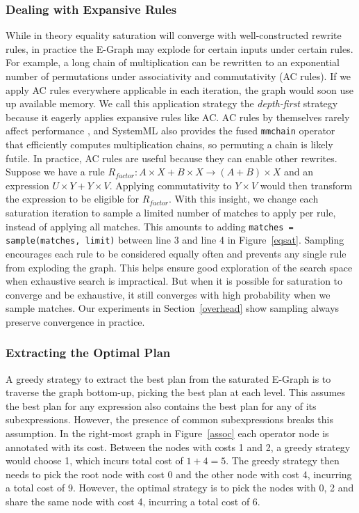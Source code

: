 \subsubsection*{Dealing with Expansive Rules}
While in theory equality saturation will converge with well-constructed rewrite
rules, in practice the E-Graph may explode for certain inputs under certain rules. For example, a long
chain of multiplication can be rewritten to an exponential number of
permutations under associativity and commutativity (AC rules). If we 
apply AC rules everywhere applicable in each iteration, the graph would soon use
up available memory. We call this application strategy the \emph{depth-first}
strategy because it eagerly applies expansive rules like AC. 
AC rules by themselves rarely affect performance , and
SystemML also provides the fused \texttt{mmchain} operator that efficiently computes
multiplication chains, so permuting a chain is likely futile. In practice, AC
rules are useful because they can enable other rewrites. Suppose we have a rule
$R_{factor}: A\times X + B\times X \rightarrow (A+B)\times X$ and an expression $U\times Y + Y\times V$.
Applying commutativity to $Y\times V$ would then transform the expression to be
eligible for $R_{factor}$. With this insight, we change each saturation
iteration to sample a limited number of matches to apply per rule, instead of
applying all matches. This amounts to adding \texttt{matches = sample(matches, limit)} between line 3 and line 4 in Figure~\ref{eqsat}. 
Sampling encourages each rule to be considered equally often
and prevents any single rule from exploding the graph. This helps ensure good
exploration of the search space when exhaustive search is impractical. 
But when it is
possible for saturation to converge and be exhaustive, it still converges with high probability
when we sample matches. Our experiments in Section~\ref{overhead} show sampling
always preserve convergence in practice.

\subsubsection*{Extracting the Optimal Plan}
\label{extraction}

A greedy strategy to extract the best plan from the saturated E-Graph is to
traverse the graph bottom-up, picking the best plan at each level. This assumes
the best plan for any expression also contains the best plan for any of its
subexpressions. However, the presence of common subexpressions breaks this
assumption. In the right-most graph in Figure~\ref{assoc} each operator 
node is annotated with its cost. 
Between the nodes with costs 1 and 2, a greedy strategy would choose 1, which
incurs total cost of $1+4=5$. The greedy strategy then needs to pick the root
node with cost 0 and the other node with cost 4, incurring a total cost of 9. 
However, the optimal strategy is to pick the nodes with 0, 2 and share the same
node with cost 4, incurring a total cost of 6. 


